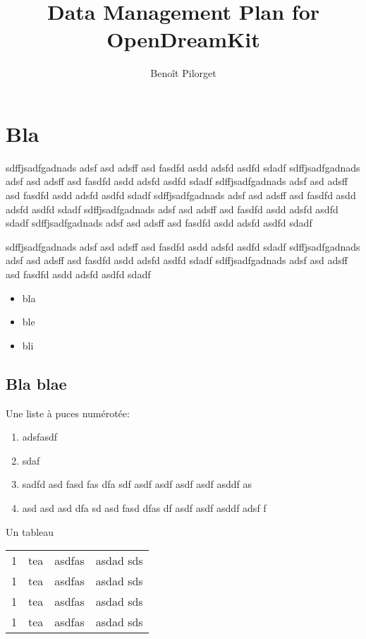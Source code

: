 \documentclass[12pt]{amsbook}
\title{Data Management Plan for OpenDreamKit}
\author{Benoît Pilorget}
\begin{document}
\maketitle

\section{Bla}

sdffjsadfgadnads adsf asd adsff asd fasdfd asdd adsfd asdfd sdadf
sdffjsadfgadnads adsf asd adsff asd fasdfd asdd adsfd asdfd sdadf
sdffjsadfgadnads adsf asd adsff asd fasdfd asdd adsfd asdfd sdadf
sdffjsadfgadnads adsf asd adsff asd fasdfd asdd adsfd asdfd sdadf
sdffjsadfgadnads adsf asd adsff asd fasdfd asdd adsfd asdfd sdadf
sdffjsadfgadnads adsf asd adsff asd fasdfd asdd adsfd asdfd sdadf


sdffjsadfgadnads adsf asd adsff asd fasdfd asdd adsfd asdfd sdadf
sdffjsadfgadnads adsf asd adsff asd fasdfd asdd adsfd asdfd sdadf
sdffjsadfgadnads adsf asd adsff asd fasdfd asdd adsfd asdfd sdadf

\begin{itemize}
\item bla
\item ble
\item bli
\end{itemize}

\subsection{Bla blae}

Une liste à puces numérotée:
\begin{enumerate}
\item adsfasdf
\item sdaf
\item sadfd asd fasd fas dfa sdf asdf asdf asdf asdf asddf as
\item asd asd asd dfa sd asd fasd dfas df asdf asdf asddf adsf f
\end{enumerate}

Un tableau
\begin{tabular}{|l|c|r|r|}
\hline
1 & tea & asdfas & asdad sds\\
1 & tea & asdfas & asdad sds\\
1 & tea & asdfas & asdad sds\\\hline
1 & tea & asdfas & asdad sds\\\hline
\end{tabular}
\end{document}
